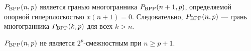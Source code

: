 
\begin{remark}
\label{MaksRemark}
$P_{\textup{BPP}}(n,p)$ является гранью многогранника $P_{\textup{BPP}}(n+1,p)$, определяемой опорной гиперплоскостью $x(n+1) = 0$. 
Следовательно, $P_{\textup{BPP}}(n,p)$ --- грань многогранника $P_{\textup{BPP}}(k,p)$ для всех $k > n$.
\end{remark}

\begin{lemma}
\label{MaksLemma2}
$P_{\textup{BPP}}(n,p)$ не является $2^p$-смежностным при $n \ge p+1$.
\end{lemma}
